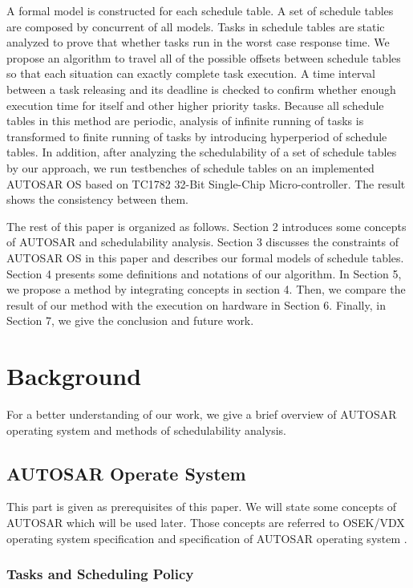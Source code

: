 \documentclass[sigconf]{acmart}
\begin{document}
A formal model is constructed for each schedule table. A set of schedule tables are composed by concurrent of all models. Tasks in schedule tables are static analyzed to prove that whether tasks run in the worst case response time. We propose an algorithm to travel all of the possible offsets between schedule tables so that each situation can exactly complete task execution. A time interval between a task releasing and its deadline is checked to confirm whether enough execution time for itself and other higher priority tasks. Because all schedule tables in this method are periodic, analysis of infinite running of tasks is transformed to finite running of tasks by introducing hyperperiod of schedule tables. In addition, after analyzing the schedulability of a set of schedule tables by our approach, we run testbenches of schedule tables on an implemented AUTOSAR OS based on TC1782 32-Bit Single-Chip Micro-controller. The result shows the consistency between them.


The rest of this paper is organized as follows. Section 2 introduces some concepts of AUTOSAR and schedulability analysis. Section 3 discusses the constraints of AUTOSAR OS in this paper and describes our formal models of schedule tables. Section 4 presents some definitions and notations of our algorithm. In Section 5, we propose a method by integrating concepts in section 4. Then, we compare the result of our method with the execution on hardware in Section 6. Finally, in Section 7, we give the conclusion and future work.
\section{Background}
For a better understanding of our work, we give a brief overview of AUTOSAR operating system and methods of schedulability analysis.
\subsection{AUTOSAR Operate System}

This part is given as prerequisites of this paper. We will state some concepts of AUTOSAR which will be used later. Those concepts are referred to OSEK/VDX operating system specification \cite{osek} and specification of AUTOSAR operating system \cite{autosar}.
\subsubsection{Tasks and Scheduling Policy}
\end{document}
